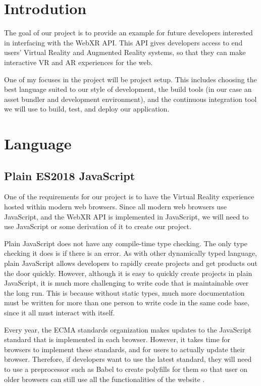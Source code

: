 \documentclass[onecolumn, draftclsnofoot,10pt, compsoc]{IEEEtran}
\begin{document}
\section{Introdution}
The goal of our project is to provide an example for future developers interested in interfacing with the WebXR API. This API gives developers access to end users' Virtual Reality and Augmented Reality systems, so that they can make interactive VR and AR experiences for the web. 

One of my focuses in the project will be project setup. This includes choosing the best language suited to our style of development, the build tools (in our case an asset bundler and development environment), and the continuous integration tool we will use to build, test, and deploy our application.

\section{Language}
\subsection{Plain ES2018 JavaScript}
One of the requirements for our project is to have the Virtual Reality experience hosted within modern web browsers. Since all modern web browsers use JavaScript, and the WebXR API is implemented in JavaScript, we will need to use JavaScript or some derivation of it to create our project. 

Plain JavaScript does not have any compile-time type checking. The only type checking it does is if there is an error. As with other dynamically typed language, plain JavaScript allows developers to rapidly create projects and get products out the door quickly. However, although it is easy to quickly create projects in plain JavaScript, it is much more challenging to write code that is maintainable over the long run. This is because without static types, much more documentation must be written for more than one person to write code in the same code base, since it all must interact with itself. 

Every year, the ECMA standards organization makes updates to the JavaScript standard that is implemented in each browser. However, it takes time for browsers to implement these standards, and for users to actually update their browser. Therefore, if developers want to use the latest standard, they will need to use a preprocessor such as Babel to create polyfills for them so that user on older browsers can still use all the functionalities of the website \cite{babel}. 
\end{document}
